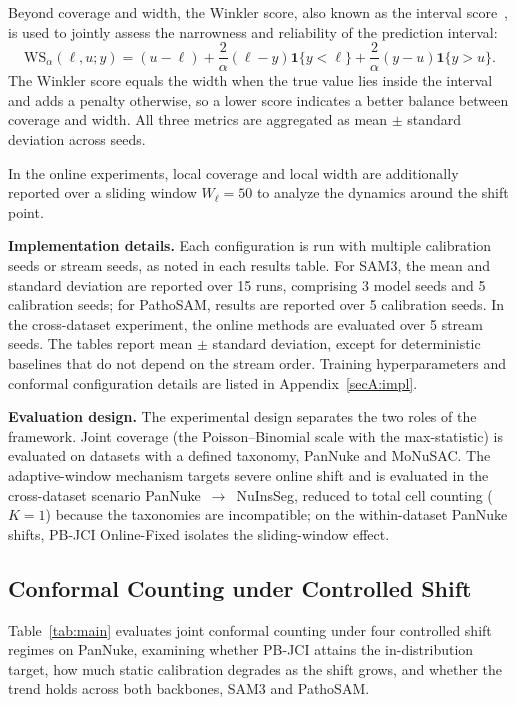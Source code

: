 \documentclass[smallextended,natbib]{svjour3}
\begin{document}
Beyond coverage and width, the Winkler score, also known as the interval
score~\citep{winkler1972decision}, is used to jointly assess the narrowness and
reliability of the prediction interval:
\begin{equation}
\mathrm{WS}_{\alpha}(\ell,u;y)
=
(u-\ell)
+
\frac{2}{\alpha}(\ell-y)\mathbf{1}\{y<\ell\}
+
\frac{2}{\alpha}(y-u)\mathbf{1}\{y>u\}.
\end{equation}
The Winkler score equals the width when the true value lies inside the interval and
adds a penalty otherwise, so a lower score indicates a better balance between
coverage and width. All three metrics are aggregated as mean \(\pm\) standard
deviation across seeds.

In the online experiments, local coverage and local width are additionally reported
over a sliding window \(W_\ell=50\) to analyze the dynamics around the shift point.

\textbf{Implementation details.}
Each configuration is run with multiple calibration seeds or stream seeds, as noted
in each results table. For SAM3, the mean and standard deviation are reported over
15 runs, comprising 3 model seeds and 5 calibration seeds; for PathoSAM, results are
reported over 5 calibration seeds. In the cross-dataset experiment, the online
methods are evaluated over 5 stream seeds. The tables report mean \(\pm\) standard
deviation, except for deterministic baselines that do not depend on the stream
order. Training hyperparameters and conformal configuration details are listed in
Appendix~\ref{secA:impl}.

\textbf{Evaluation design.}
The experimental design separates the two roles of the framework. Joint coverage
(the Poisson--Binomial scale with the max-statistic) is evaluated on datasets with
a defined taxonomy, PanNuke and MoNuSAC. The adaptive-window mechanism targets
severe online shift and is evaluated in the cross-dataset scenario
PanNuke~\(\to\)~NuInsSeg, reduced to total cell counting (\(K=1\)) because the
taxonomies are incompatible; on the within-dataset PanNuke shifts, PB-JCI
Online-Fixed isolates the sliding-window effect.

\subsection{Conformal Counting under Controlled Shift}\label{sec:main}

Table~\ref{tab:main} evaluates joint conformal counting under four controlled shift
regimes on PanNuke, examining whether PB-JCI attains the in-distribution target, how
much static calibration degrades as the shift grows, and whether the trend holds
across both backbones, SAM3 and PathoSAM.
\end{document}
